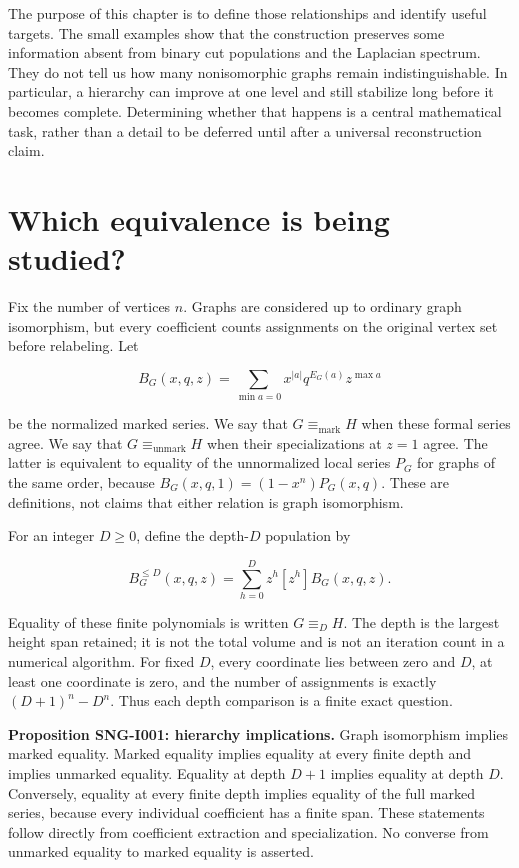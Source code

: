\documentclass[
  11pt,
  a4paper,
]{report}
\begin{document}
The purpose of this chapter is to define those relationships and
identify useful targets. The small examples show that the construction
preserves some information absent from binary cut populations and the
Laplacian spectrum. They do not tell us how many nonisomorphic graphs
remain indistinguishable. In particular, a hierarchy can improve at one
level and still stabilize long before it becomes complete. Determining
whether that happens is a central mathematical task, rather than a
detail to be deferred until after a universal reconstruction claim.

\hypertarget{which-equivalence-is-being-studied}{%
\section{Which equivalence is being
studied?}\label{which-equivalence-is-being-studied}}

Fix the number of vertices \(n\). Graphs are considered up to ordinary
graph isomorphism, but every coefficient counts assignments on the
original vertex set before relabeling. Let

\[
B_G(x,q,z)=\sum_{\min a=0}x^{|a|}q^{E_G(a)}z^{\max a}
\]

be the normalized marked series. We say that
\(G\equiv_{\mathrm{mark}}H\) when these formal series agree. We say that
\(G\equiv_{\mathrm{unmark}}H\) when their specializations at \(z=1\)
agree. The latter is equivalent to equality of the unnormalized local
series \(P_G\) for graphs of the same order, because
\(B_G(x,q,1)=(1-x^n)P_G(x,q)\). These are definitions, not claims that
either relation is graph isomorphism.

For an integer \(D\ge0\), define the depth-\(D\) population by

\[
B_G^{\le D}(x,q,z)=\sum_{h=0}^{D}z^h[z^h]B_G(x,q,z).
\]

Equality of these finite polynomials is written \(G\equiv_DH\). The
depth is the largest height span retained; it is not the total volume
and is not an iteration count in a numerical algorithm. For fixed \(D\),
every coordinate lies between zero and \(D\), at least one coordinate is
zero, and the number of assignments is exactly \((D+1)^n-D^n\). Thus
each depth comparison is a finite exact question.

\textbf{Proposition SNG-I001: hierarchy implications.} Graph isomorphism
implies marked equality. Marked equality implies equality at every
finite depth and implies unmarked equality. Equality at depth \(D+1\)
implies equality at depth \(D\). Conversely, equality at every finite
depth implies equality of the full marked series, because every
individual coefficient has a finite span. These statements follow
directly from coefficient extraction and specialization. No converse
from unmarked equality to marked equality is asserted.
\end{document}

